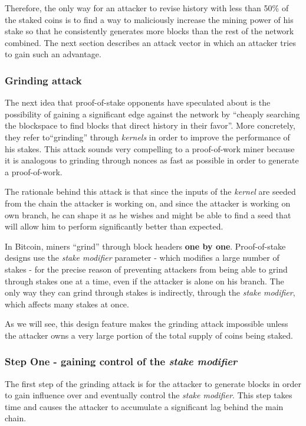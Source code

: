 \documentclass[a4paper,11pt]{article}
\begin{document}
Therefore, the only way for an attacker to revise history with less than 50\% of the staked coins is to find a way to maliciously increase the mining power of his stake so that he consistently generates more blocks than the rest of the network combined. The next section describes an attack vector in which an attacker tries to gain such an advantage.

\subsubsection{Grinding attack}
\label{333}

The next idea that proof-of-stake opponents have speculated about is the possibility of gaining a significant edge against the network by ``cheaply searching the blockspace to find blocks that direct history in their favor''\cite{distributedconsensus}. More concretely, they refer to``grinding'' through \textit{kernels} in order to improve the performance of his stakes. This attack sounds very compelling to a proof-of-work miner because it is analogous to grinding through nonces as fast as possible in order to generate a proof-of-work. 
 
The rationale behind this attack is that since the inputs of the \textit{kernel} are seeded from the chain the attacker is working on, and since the attacker is working on own branch, he can shape it as he wishes and might be able to find a seed that will allow him to perform significantly better than expected.

In Bitcoin, miners ``grind'' through block headers \textbf{one by one}. Proof-of-stake designs use the \textit{stake modifier} parameter - which modifies a large number of stakes - for the precise reason of preventing attackers from being able to grind through stakes one at a time, even if the attacker is alone on his branch. The only way they can grind through stakes is indirectly, through the \textit{stake modifier}, which affects many stakes at once.

As we will see, this design feature makes the grinding attack impossible unless the attacker owns a very large portion of the total supply of coins being staked.

\subsubsection*{Step One - gaining control of the \textit{stake modifier}}

The first step of the grinding attack is for the attacker to generate blocks in order to gain influence over and eventually control the \textit{stake modifier}. This step takes time and causes
the attacker to accumulate a significant lag behind the main chain. 
\end{document}
